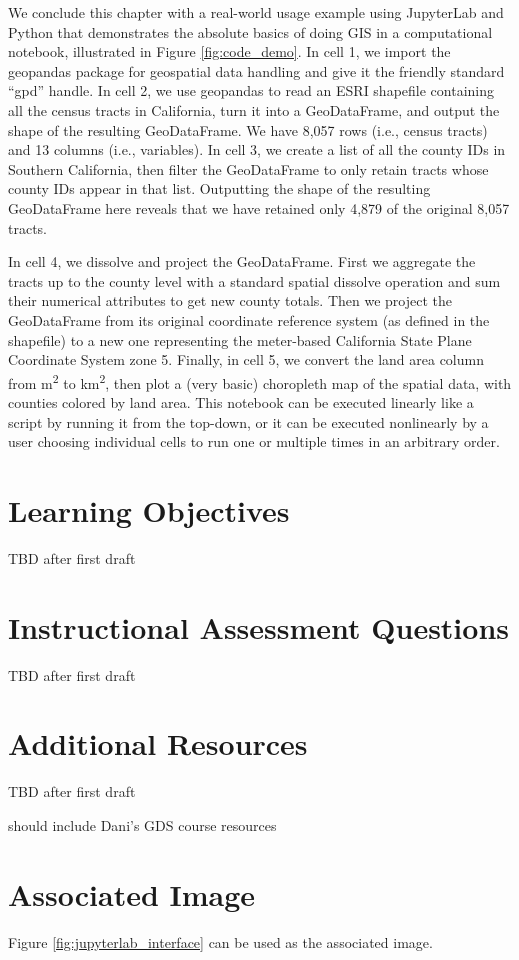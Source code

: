 \documentclass[11pt,letterpaper]{article}
\begin{document}
We conclude this chapter with a real-world usage example using JupyterLab and Python that demonstrates the absolute basics of doing GIS in a computational notebook, illustrated in Figure \ref{fig:code_demo}. In cell 1, we import the geopandas package for geospatial data handling and give it the friendly standard \enquote{gpd} handle. In cell 2, we use geopandas to read an ESRI shapefile containing all the census tracts in California, turn it into a GeoDataFrame, and output the shape of the resulting GeoDataFrame. We have 8,057 rows (i.e., census tracts) and 13 columns (i.e., variables). In cell 3, we create a list of all the county IDs in Southern California, then filter the GeoDataFrame to only retain tracts whose county IDs appear in that list. Outputting the shape of the resulting GeoDataFrame here reveals that we have retained only 4,879 of the original 8,057 tracts.

In cell 4, we dissolve and project the GeoDataFrame. First we aggregate the tracts up to the county level with a standard spatial dissolve operation and sum their numerical attributes to get new county totals. Then we project the GeoDataFrame from its original coordinate reference system (as defined in the shapefile) to a new one representing the meter-based California State Plane Coordinate System zone 5. Finally, in cell 5, we convert the land area column from m\textsuperscript{2} to km\textsuperscript{2}, then plot a (very basic) choropleth map of the spatial data, with counties colored by land area. This notebook can be executed linearly like a script by running it from the top-down, or it can be executed nonlinearly by a user choosing individual cells to run one or multiple times in an arbitrary order.

\setlength{\bibsep}{0.00cm plus 0.05cm}



\section*{Learning Objectives}

TBD after first draft

\section*{Instructional Assessment Questions}

TBD after first draft

\section*{Additional Resources}

TBD after first draft

should include Dani's GDS course resources

\section*{Associated Image}

Figure \ref{fig:jupyterlab_interface} can be used as the associated image.
\end{document}
